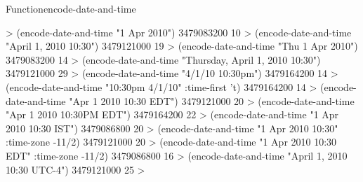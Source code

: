 \documentclass[10pt,twoside,english,pdftex]{article}
\begin{document}
\begin{functiondoc}{Function}{encode-date-and-time}
\fnexamples
%
\W\supp
\begin{example}
  > (encode-date-and-time "1 Apr 2010")
  3479083200
  10
  > (encode-date-and-time "April 1, 2010 10:30")
  3479121000
  19\goodpagebreak
  > (encode-date-and-time "Thu 1 Apr 2010")
  3479083200
  14
  > (encode-date-and-time "Thursday, April 1, 2010 10:30")
  3479121000
  29\goodpagebreak
  > (encode-date-and-time "4/1/10 10:30pm")
  3479164200
  14
  > (encode-date-and-time "10:30pm 4/1/10" :time-first 't)
  3479164200
  14\goodpagebreak
  > (encode-date-and-time "Apr 1 2010 10:30 EDT")
  3479121000
  20\goodpagebreak
  > (encode-date-and-time "Apr 1 2010 10:30PM EDT")
  3479164200
  22\goodpagebreak
  > (encode-date-and-time "1 Apr 2010 10:30 IST")
  3479086800
  20\goodpagebreak
  > (encode-date-and-time "1 Apr 2010 10:30" :time-zone -11/2)
  3479121000
  20\goodpagebreak
  > (encode-date-and-time "1 Apr 2010 10:30 EDT" :time-zone -11/2)
  3479086800
  16\goodpagebreak
  > (encode-date-and-time "April 1, 2010 10:30 UTC-4")
  3479121000
  25
  >
\end{example}

\end{functiondoc}

\end{document}
